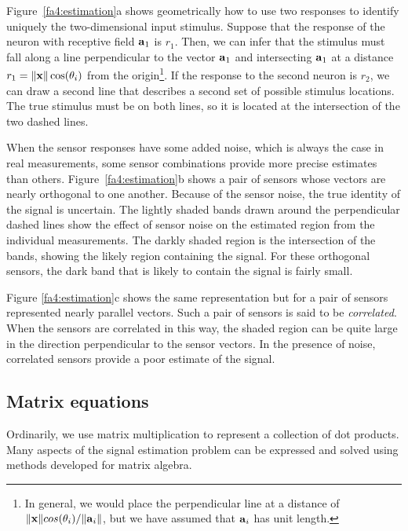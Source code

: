 Figure~\ref{fa4:estimation}a shows geometrically how to use two
responses to identify uniquely the two-dimensional input stimulus.
Suppose that the response of the neuron with receptive field
$\mbox{${\bf a}$}_1$ is $r_1$.  Then, we can infer that the stimulus must fall
along a line perpendicular to the vector $\mbox{${\bf a}$}_1$ and intersecting
$\mbox{${\bf a}$}_1$ at a distance $\mbox{${r}_{1}$} = \| \mbox{${\bf x}$} \| \cos (
\theta_i)$ from the origin\footnote{In general, we would place the
perpendicular line at a distance of $\| \mbox{${\bf x}$} \| cos ( \theta_i ) /
\| \mbox{${\bf a}$}_i\|$, but we have assumed that $\mbox{${\bf a}$}_i$ has unit
length.}.  If the response to the second neuron is $r_2$, we can draw
a second line that describes a second set of possible stimulus
locations.  The true stimulus must be on both lines, so it is located
at the intersection of the two dashed lines.

When the sensor responses have some added noise, which is always the
case in real measurements, some sensor combinations provide more
precise estimates than others.  Figure~\ref{fa4:estimation}b shows a
pair of sensors whose vectors are nearly orthogonal to one another.
Because of the sensor noise, the true identity of the signal is
uncertain.  The lightly shaded bands drawn around the perpendicular
dashed lines show the effect of sensor noise on the estimated region
from the individual measurements.  The darkly shaded region is the
intersection of the bands, showing the likely region containing the
signal.  For these orthogonal sensors, the dark band that is likely to
contain the signal is fairly small.

Figure \ref{fa4:estimation}c shows the same representation but for a
pair of sensors represented nearly parallel vectors.  Such a pair of
sensors is said to be {\em correlated}.  When the sensors are
correlated in this way, the shaded region can be quite large in the
direction perpendicular to the sensor vectors.  In the presence of
noise, correlated sensors provide a poor estimate of the signal.

\subsection*{Matrix equations}
Ordinarily, we use matrix multiplication to represent a collection of
dot products.  Many aspects of the signal estimation problem can
be expressed and solved using methods developed for matrix algebra.

